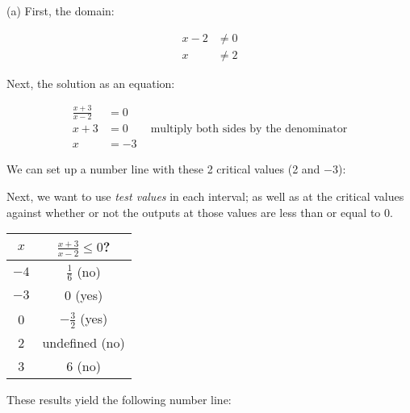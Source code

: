 \begin{solution}

(a) First, the domain:

\begin{align*}
    x - 2 &\neq 0 \\
    x &\neq 2
\end{align*}

Next, the solution as an equation:

\begin{align*}
    \frac{x+3}{x-2} &= 0 \\
    x + 3 &= 0 \qquad \text{multiply both sides by the denominator} \\
    x &= -3 
\end{align*}

We can set up a number line with these 2 critical values (2 and $-3$):

\begin{center}
\end{center}

Next, we want to use \textit{test values} in each interval; as well as at the critical values against whether or not the outputs at those values are less than or equal to 0.

\begin{center}
\setlength{\extrarowheight}{4pt}
\begin{tabular}{c|c}
    $x$ & $\frac{x+3}{x-2} \leq 0$? \\ \hline
    $-4$ & $\frac{1}{6}$ (no) \\[5pt] 
    $-3$ & 0 (yes) \\[5pt]
    0 & $-\frac{3}{2}$ (yes) \\[5pt]
    2 & undefined (no) \\[5pt]
    3 & 6 (no) 
\end{tabular}
\end{center}

These results yield the following number line:

\begin{center}
\end{center}


\end{solution}
